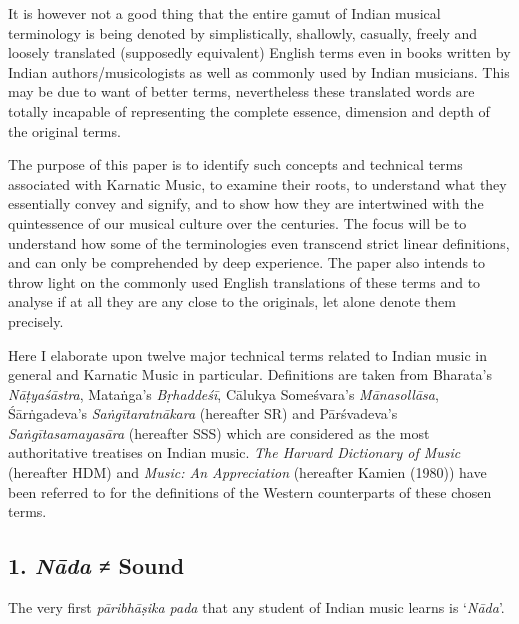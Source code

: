 It is however not a good thing that the entire gamut of Indian musical terminology is being denoted by simplistically, shallowly, casually, freely and loosely translated (supposedly equivalent) English terms even in books written by Indian authors/musicologists as well as commonly used by Indian musicians. This may be due to want of better terms, nevertheless these translated words are totally incapable of representing the complete essence, dimension and depth of the original terms. 

The purpose of this paper is to identify such concepts and technical terms associated with Karnatic Music, to examine their roots, to understand what they essentially convey and signify, and to show how they are intertwined with the quintessence of our musical culture over the centuries. The focus will be to understand how some of the terminologies even transcend strict linear definitions, and can only be comprehended by deep experience. The paper also intends to throw light on the commonly used English translations of these terms and to analyse if at all they are any close to the originals, let alone denote them precisely.

Here I elaborate upon twelve major technical terms related to Indian music in general and Karnatic Music in particular. Definitions are taken from Bharata’s \textit{Nāṭyaśāstra}, Mataṅga’s \textit{Bṛhaddeśī}, Cālukya Someśvara’s \textit{Mānasollāsa}, Śārṅgadeva’s \textit{Saṅgītaratnākara} (hereafter SR) and Pārśvadeva’s \textit{Saṅgītasamayasāra} (hereafter SSS) which are considered as the most authoritative treatises on Indian music. \textit{The Harvard Dictionary of Music} (hereafter HDM) and \textit{Music: An Appreciation} (hereafter Kamien (1980)) have been referred to for the definitions of the Western counterparts of these chosen terms.

\subsection*{1. \textit{Nāda} ≠ Sound}

The very first \textit{pāribhāṣika pada} that any student of Indian music learns is ‘\textit{Nāda}’.

